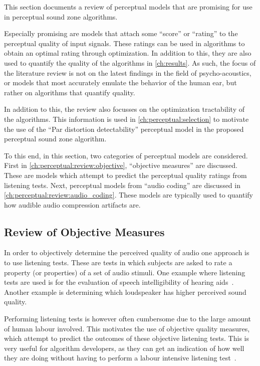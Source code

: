 This section documents a review of perceptual models that are promising for use in perceptual sound zone
algorithms.

Especially promising are models that attach some ``score'' or ``rating'' to the perceptual quality of input signals.
These ratings can be used in algorithms to obtain an optimal rating through optimization.
In addition to this, they are also used to quantify the quality of the algorithms in \autoref{ch:results}.
As such, the focus of the literature review is not on the latest findings in the field of psycho-acoustics, or models 
that most accurately emulate the behavior of the human ear, but rather on algorithms that quantify quality.

In addition to this, the review also focusses on the optimization tractability of the algorithms.
This information is used in \autoref{ch:perceptual:selection} to motivate the use of the 
``Par distortion detectability'' perceptual model in the proposed perceptual sound zone algorithm.

To this end, in this section, two categories of perceptual models are considered.
First in \autoref{ch:perceptual:review:objective}, ``objective measures'' are discussed.
These are models which attempt to predict the perceptual quality ratings from listening tests. 
Next, perceptual models from ``audio coding'' are discussed in \autoref{ch:perceptual:review:audio_coding}.
These models are typically used to quantify how audible audio compression artifacts are.


\subsection{Review of Objective Measures}
\label{ch:perceptual:review:objective}
In order to objectively determine the perceived quality of audio one approach is to use listening tests.
These are tests in which subjects are asked to rate a property (or properties) of a set of audio stimuli.
One example where listening tests are used is for the evaluation of speech 
intelligibility of hearing aids~\cite{taal2011algorithm}.
Another example is determining which loudspeaker has higher perceived sound quality.

Performing listening tests is however often cumbersome due to the large amount of human labour involved.
This motivates the use of objective quality measures, which attempt to predict the outcomes of these objective listening tests.
This is very useful for algorithm developers, as they can get an indication of how well they are doing
without having to perform a labour intensive listening test~\cite{taal2011algorithm}.

